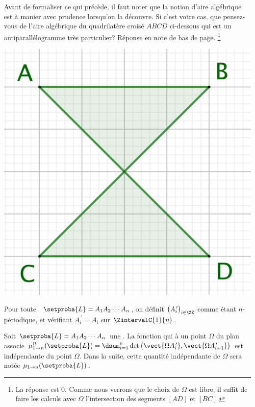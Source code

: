 Avant de formaliser ce qui précède, il faut noter que la notion d'aire algébrique est à manier avec prudence lorsqu'on la découvre. 
Si c'est votre cas, que pensez-vous de l'aire algébrique du quadrilatère croisé $ABCD$ ci-dessous qui est un antiparallélogramme très particulier? Réponse en note de bas de page.%
\footnote{
	La réponse est $0$. Comme nous verrons que le choix de $\Omega$ est libre, il suffit de faire les calculs avec $\Omega$ l'intersection des segments $[AD]$ et $[BC]$.
}

\begin{center}
	\includegraphics[scale=.4]{content/polygon/sufficient-cond/g-area-anti-para.png}
\end{center}




\begin{defi} \label{garea-pt-ct}
	Pour toute \nline\  $\setproba{L} = A_1 A_2 \cdots A_n$, on définit $\big( A^{\,\prime}_i \big)_{i \in \ZZ}$ comme étant $n$-périodique, et vérifiant $A^{\,\prime}_{i} = A_i$ sur $\ZintervalC{1}{n}$.
\end{defi}




\begin{fact} \label{garea-pt-ct}
	Soit $\setproba{L} = A_1 A_2 \cdots A_n$ une \nline.
	La fonction qui à un point $\Omega$ du plan associe 
	$\mu_{1 \to n}^\Omega (\setproba{L}) = \dsum_{i=1}^{n} \det \big( \vect{\Omega A^{\,\prime}_i} , \vect{\Omega A^{\,\prime}_{i+1}} \big)$ est indépendante du point $\Omega$.
	Dans la suite, cette quantité indépendante de $\Omega$ sera notée $\mu_{1 \to n} (\setproba{L})$.
\end{fact}


